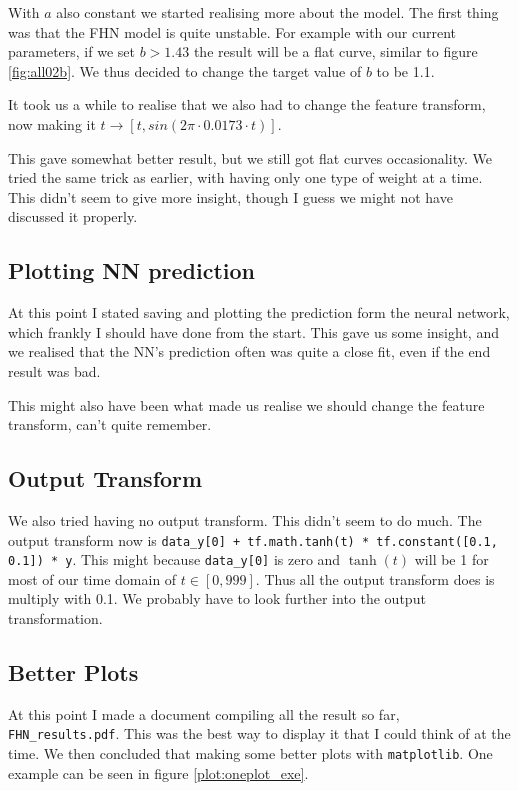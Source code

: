 \documentclass[a4paper]{article}
\begin{document}
With $a$ also constant we started realising more about the model. The first thing was that the FHN model is quite unstable. For example with our current parameters, if we set $b>1.43$ the result will be a flat curve, similar to figure \ref{fig:all02b}. We thus decided to change the target value of $b$ to be 1.1.

It took us a while to realise that we also had to change the feature transform, now making it $t \rightarrow \left[ t, sin(2 \pi \cdot 0.0173 \cdot t) \right]$. 

This gave somewhat better result, but we still got flat curves occasionality. We tried the same trick as earlier, with having only one type of weight at a time. This didn't seem to give more insight, though I guess we might not have discussed it properly. 

\subsection{Plotting NN prediction} %

At this point I stated saving and plotting the prediction form the neural network, which frankly I should have done from the start. This gave us some insight, and we realised that the NN's prediction often was quite a close fit, even if the end result was bad. 

This might also have been what made us realise we should change the feature transform, can't quite remember.


\subsection{Output Transform}

We also tried having no output transform. This didn't seem to do much. The output transform now is \lstinline|data_y[0] + tf.math.tanh(t) * tf.constant([0.1, 0.1]) * y|. This might because \lstinline|data_y[0]| is zero and $\tanh(t)$ will be 1 for most of our time domain of $t \in [0, 999]$. Thus all the output transform does is multiply with 0.1. We probably have to look further into the output transformation.


\subsection{Better Plots}

At this point I made a document compiling all the result so far, \lstinline|FHN_results.pdf|. This was the best way to display it that I could think of at the time. We then concluded that making some better plots with \lstinline|matplotlib|. One example can be seen in figure \ref{plot:oneplot_exe}.
\end{document}
